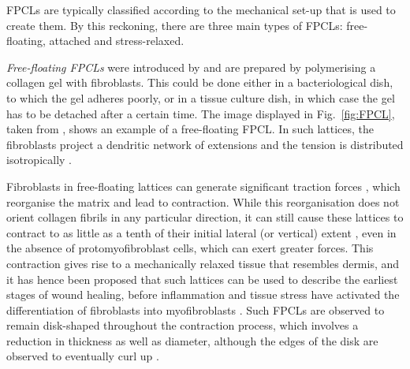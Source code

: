 FPCLs are typically classified according to the mechanical set-up that is used to create them. By this reckoning, there are three main types of FPCLs: free-floating, attached and stress-relaxed.

\textit{Free-floating FPCLs} were introduced by \citet{Bell1979} and are prepared by polymerising a collagen gel with fibroblasts. This could be done either in a bacteriological dish, to which the gel adheres poorly, or in a tissue culture dish, in which case the gel has to be detached after a certain time. The image displayed in Fig.~\ref{fig:FPCL}, taken from \citet{Kelynack2009}, shows an example of a free-floating FPCL. In such lattices, the fibroblasts project a dendritic network of extensions and the tension is distributed isotropically \citep{Grinnell2003b,Rhee2007}.

Fibroblasts in free-floating lattices can generate significant traction forces \citep{MajnoCells,Grinnell2000}, which reorganise the matrix and lead to contraction. While this reorganisation does not orient collagen fibrils in any particular direction, it can still cause these lattices to contract to as little as a tenth of their initial lateral (or vertical) extent \citep{Bell1979,Steinberg1980,Grinnell1984,Guidry1985}, even in the absence of protomyofibroblast cells, which can exert greater forces. This contraction gives rise to a mechanically relaxed tissue that resembles dermis, and it has hence been proposed that such lattices can be used to describe the earliest stages of wound healing, before inflammation and tissue stress have activated the differentiation of fibroblasts into myofibroblasts \citep{Grinnell1994}. Such FPCLs are observed to remain disk-shaped throughout the contraction process, which involves a reduction in thickness as well as diameter, although the edges of the disk are observed to eventually curl up \citep{Bell1979}.

